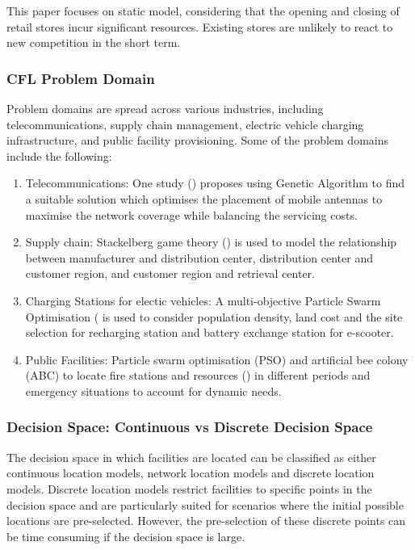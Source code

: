 \documentclass{ecai}
\begin{document}
This paper focuses on static model, considering that the opening and closing of retail stores incur significant resources. Existing stores are unlikely to react to new competition in the short term. 

\subsubsection{CFL Problem Domain}
Problem domains are spread across various industries, including telecommunications, supply chain management, electric vehicle charging infrastructure, and public facility provisioning. Some of the problem domains include the following:

\begin{enumerate}
    \item Telecommunications: One study (\cite{amiri2021optimization}) proposes using Genetic Algorithm to find a suitable solution which optimises the placement of mobile antennas to maximise the network coverage while balancing the servicing costs.   
    \item Supply chain: Stackelberg game theory (\cite{chouhan2022designing}) is used to model the relationship between manufacturer and distribution center, distribution center and customer region, and customer region and retrieval center. 
    \item Charging Stations for electic vehicles: A multi-objective Particle Swarm Optimisation (\cite{chen2018location} is used to consider population density, land cost and the site selection for recharging station and battery exchange station for e-scooter. 
    \item Public Facilities: Particle swarm optimisation (PSO) and artificial bee colony (ABC) to locate fire stations and resources (\cite{hajipour2022dynamic}) in different periods and emergency situations to account for dynamic needs.  
\end{enumerate}

\subsubsection{Decision Space: Continuous vs Discrete Decision Space }
The decision space in which facilities are located can be classified as either continuous location models, network location models and discrete location models. Discrete location models restrict facilities to specific points in the decision space and are particularly suited for scenarios where the initial possible locations are pre-selected. However, the pre-selection of these discrete points can be time consuming if the decision space is large. 
\end{document}
